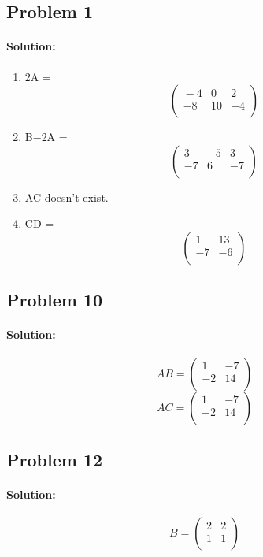 \documentclass[11pt, notitlepage]{article}
\newenvironment{solution}{\paragraph{Solution:}}{\hfill}
\begin{document}
\subsection{Problem 1}
\begin{solution}
	\begin{enumerate}[label=\alph*.)]
		\item 2A = \[\left(\begin{matrix}{}
  -4& 0&2 \\
  -8& 10&-4 \\
\end{matrix}\right)\]
		\item B$-$2A =\[\left(\begin{matrix}{}
  3& -5&3 \\
  -7& 6&-7 \\
\end{matrix}\right)\]
		\item AC doesn't exist.
		\item CD = \[\left(\begin{matrix}{}
  1& 13 \\
  -7& -6 \\
\end{matrix}\right)\]
	\end{enumerate}
\end{solution}
\subsection{Problem 10}
\begin{solution}
\[AB=\left(\begin{matrix}{}
  1&-7 \\
  -2&14 \\
\end{matrix}\right)\]
\[AC=\left(\begin{matrix}{}
  1&-7 \\
  -2&14 \\
\end{matrix}\right)\]
\end{solution}
\subsection{Problem 12}
\begin{solution}
\[B=\left(\begin{matrix}{}
  2&2 \\
  1&1 \\
\end{matrix}\right)\]
\end{solution}
\newpage
\end{document}

